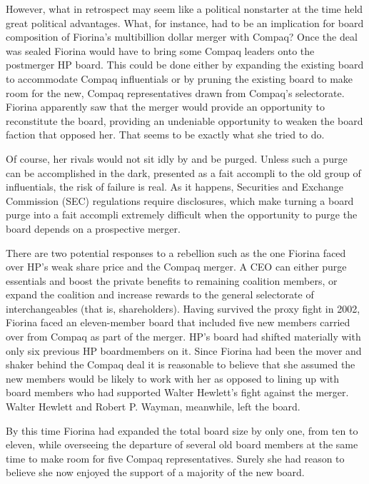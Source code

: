 \documentclass[10pt]{article}
\begin{document}
{\large However, what in retrospect may seem like a political nonstarter at the
time held great political advantages. What, for instance, had to be an
implication for board composition of Fiorina's multibillion dollar merger with
Compaq? Once the deal was sealed Fiorina would have to bring some Compaq leaders
onto the postmerger HP board. This could be done either by expanding the existing
board to accommodate Compaq influentials or by pruning the existing board to make
room for the new, Compaq representatives drawn from Compaq's selectorate. Fiorina
apparently saw that the merger would provide an opportunity to reconstitute the
board, providing an undeniable opportunity to weaken the board faction that
opposed her. That seems to be exactly what she tried to do.}

{\large Of course, her rivals would not sit idly by and be purged. Unless such a
purge can be accomplished in the dark, presented as a fait accompli to the old
group of influentials, the risk of failure is real. As it happens, Securities and
Exchange Commission (SEC) regulations require disclosures, which make turning a
board purge into a fait accompli extremely difficult when the opportunity to
purge the board depends on a prospective merger.}

{\large There are two potential responses to a rebellion such as the one Fiorina
faced over HP's weak share price and the Compaq merger. A CEO can either purge
essentials and boost the private benefits to remaining coalition members, or
expand the coalition and increase rewards to the general selectorate of
interchangeables (that is, shareholders). Having survived the proxy fight in
2002, Fiorina faced an eleven-member board that included five new members carried
over from Compaq as part of the merger. HP's board had shifted materially with
only six previous HP boardmembers on it. Since Fiorina had been the mover and
shaker behind the Compaq deal it is reasonable to believe that she assumed the
new members would be likely to work with her as opposed to lining up with board
members who had supported Walter Hewlett's fight against the merger. Walter
Hewlett and Robert P. Wayman, meanwhile, left the board.}

{\large By this time Fiorina had expanded the total board size by only one, from
ten to eleven, while overseeing the departure of several old board members at the
same time to make room for five Compaq representatives. Surely she had reason to
believe she now enjoyed the support of a majority of the new board.}
\end{document}
